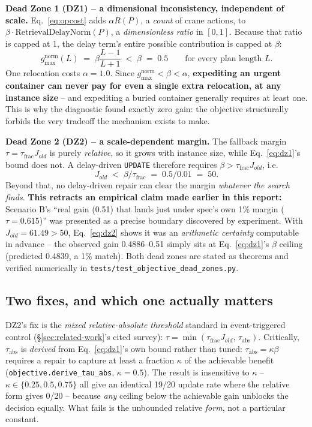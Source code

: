 \documentclass[11pt]{article}
\begin{document}
\textbf{Dead Zone 1 (DZ1) -- a dimensional inconsistency, independent of
scale.} Eq.~\ref{eq:opcost} adds $\alpha R(P)$, a \emph{count} of crane
actions, to $\beta \cdot \mathrm{RetrievalDelayNorm}(P)$, a
\emph{dimensionless ratio} in $[0,1]$. Because that ratio is capped at 1,
the delay term's entire possible contribution is capped at $\beta$:
\begin{equation}
g_{\max}^{\text{norm}}(L) \;=\; \beta\frac{L-1}{L+1} \;<\; \beta \;=\; 0.5
\qquad\text{for every plan length } L .
\label{eq:dz1}
\end{equation}
One relocation costs $\alpha = 1.0$. Since $g_{\max}^{\text{norm}} < \beta
< \alpha$, \textbf{expediting an urgent container can never pay for even a
single extra relocation, at any instance size} -- and expediting a buried
container generally requires at least one. This is why the diagnostic
found exactly zero gain: the objective structurally forbids the very
tradeoff the mechanism exists to make.

\textbf{Dead Zone 2 (DZ2) -- a scale-dependent margin.} The fallback
margin $\tau = \tau_{\text{frac}} J_{old}$ is purely \emph{relative}, so it
grows with instance size, while Eq.~\ref{eq:dz1}'s bound does not.
A delay-driven \texttt{UPDATE} therefore requires
$\beta > \tau_{\text{frac}} J_{old}$, i.e.
\begin{equation}
J_{old} \;<\; \beta/\tau_{\text{frac}} \;=\; 0.5/0.01 \;=\; 50 .
\label{eq:dz2}
\end{equation}
Beyond that, no delay-driven repair can clear the margin \emph{whatever the
search finds}. \textbf{This retracts an empirical claim made earlier in
this report:} Scenario B's ``real gain (0.51) that lands just under spec's
own 1\% margin ($\tau = 0.615$)'' was presented as a precise boundary
discovered by experiment. With $J_{old} = 61.49 > 50$, Eq.~\ref{eq:dz2}
shows it was an \emph{arithmetic certainty} computable in advance -- the
observed gain 0.4886--0.51 simply sits at Eq.~\ref{eq:dz1}'s $\beta$
ceiling (predicted 0.4839, a 1\% match). Both dead zones are stated as
theorems and verified numerically in
\texttt{tests/test\_objective\_dead\_zones.py}.

\subsection{Two fixes, and which one actually matters}

DZ2's fix is the \emph{mixed relative-absolute threshold} standard in
event-triggered control (\S\ref{sec:related-work}'s cited survey):
$\tau = \min(\tau_{\text{frac}} J_{old},\, \tau_{\text{abs}})$. Critically,
$\tau_{\text{abs}}$ is \emph{derived} from Eq.~\ref{eq:dz1}'s own bound
rather than tuned: $\tau_{\text{abs}} = \kappa\beta$ requires a repair to
capture at least a fraction $\kappa$ of the achievable benefit
(\texttt{objective.derive\_tau\_abs}, $\kappa=0.5$). The result is
insensitive to $\kappa$ -- $\kappa \in \{0.25, 0.5, 0.75\}$ all give an
identical 19/20 update rate where the relative form gives 0/20 -- because
\emph{any} ceiling below the achievable gain unblocks the decision equally.
What fails is the unbounded relative \emph{form}, not a particular constant.
\end{document}
